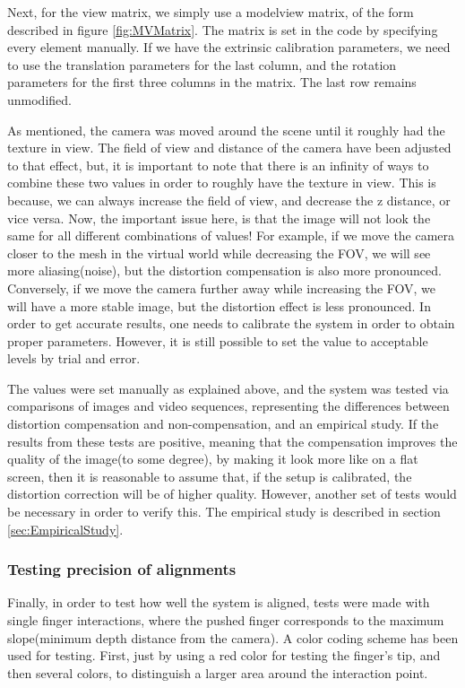\documentclass[]{article}
\begin{document}
Next, for the view matrix, we simply use a modelview matrix, of the form described in figure \ref{fig:MVMatrix}. The matrix is set in the code by specifying every element manually. If we have the extrinsic calibration parameters, we need to use the translation parameters for the last column, and the rotation parameters for the first three columns in the matrix. The last row remains unmodified.

As mentioned, the camera was moved around the scene until it roughly had the texture in view. The field of view and distance of the camera have been adjusted to that effect, but, it is important to note that there is an infinity of ways to combine these two values in order to roughly have the texture in view. This is because, we can always increase the field of view, and decrease the z distance, or vice versa. Now, the important issue here, is that the image will not look the same for all different combinations of values! For example, if we move the camera closer to the mesh in the virtual world while decreasing the FOV, we will see more aliasing(noise), but the distortion compensation is also more pronounced. Conversely, if we move the camera further away while increasing the FOV, we will have a more stable image, but the distortion effect is less pronounced. In order to get accurate results, one needs to calibrate the system in order to obtain proper parameters. However, it is still possible to set the value to acceptable levels by trial and error.

The values were set manually as explained above, and the system was tested via comparisons of images and video sequences, representing the differences between distortion compensation and non-compensation, and an empirical study. If the results from these tests are positive, meaning that the compensation improves the quality of the image(to some degree), by making it look more like on a flat screen, then it is reasonable to assume that, if the setup is calibrated, the distortion correction will be of higher quality. However, another set of tests would be necessary in order to verify this. The empirical study is described in section \ref{sec:EmpiricalStudy}.

\subsubsection{Testing precision of alignments}

Finally, in order to test how well the system is aligned, tests were made with single finger interactions, where the pushed finger corresponds to the maximum slope(minimum depth distance from the camera). A color coding scheme has been used for testing. First, just by using a red color for testing the finger's tip, and then several colors, to distinguish a larger area around the interaction point. 
\end{document}
